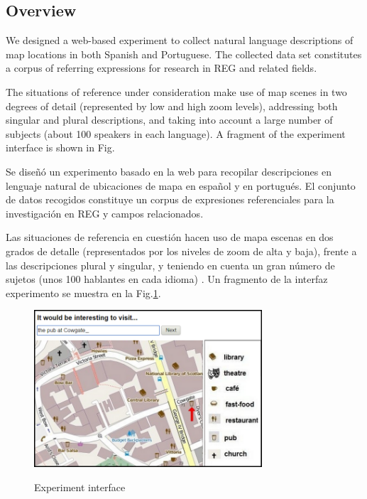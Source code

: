 \subsection{Overview}

We designed a web-based experiment to collect natural language descriptions of map locations in both Spanish and Portuguese. The collected data set constitutes a corpus of referring expressions for research in REG and related fields. 

The situations of reference under consideration make use of map scenes in two degrees of detail (represented by low and high zoom levels), addressing both singular and plural descriptions, and taking into account a large number of subjects (about 100 speakers in each language). A fragment of the experiment interface is shown in Fig. 


Se dise\~n\'o un experimento basado en la web para recopilar descripciones en lenguaje natural de ubicaciones de mapa en espa\~nol y en portugu\'es. El conjunto de datos recogidos constituye un corpus de expresiones referenciales para la investigaci\'on en REG y campos relacionados.

Las situaciones de referencia en cuesti\'on hacen uso de mapa escenas en dos grados de detalle (representados por los niveles de zoom de alta y baja), frente a las descripciones plural y singular, y teniendo en cuenta un gran n\'umero de sujetos (unos 100 hablantes en cada idioma) . Un fragmento de la interfaz experimento se muestra en la Fig.\ref{fig-interface}.

\begin{figure}[ht]
\begin{center}
\includegraphics[width=8.5cm]{figures/interface.png}\\[0pt]
\caption{Experiment interface}
\label{fig-interface}
\end{center}
\end{figure}


